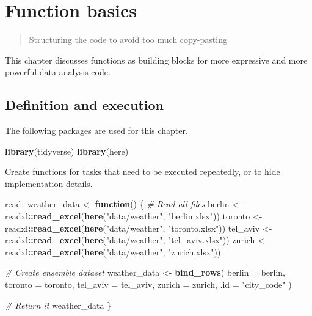 \documentclass[]{book}
\newenvironment{Shaded}{\begin{snugshade}}{\end{snugshade}}
\newcommand{\CommentTok}[1]{\textcolor[rgb]{0.56,0.35,0.01}{\textit{#1}}}
\newcommand{\ControlFlowTok}[1]{\textcolor[rgb]{0.13,0.29,0.53}{\textbf{#1}}}
\newcommand{\DataTypeTok}[1]{\textcolor[rgb]{0.13,0.29,0.53}{#1}}
\newcommand{\KeywordTok}[1]{\textcolor[rgb]{0.13,0.29,0.53}{\textbf{#1}}}
\newcommand{\NormalTok}[1]{#1}
\newcommand{\OperatorTok}[1]{\textcolor[rgb]{0.81,0.36,0.00}{\textbf{#1}}}
\newcommand{\StringTok}[1]{\textcolor[rgb]{0.31,0.60,0.02}{#1}}
\begin{document}
\hypertarget{function-basics}{%
\chapter{Function basics}\label{function-basics}}

\begin{quote}
Structuring the code to avoid too much copy-pasting
\end{quote}

This chapter discusses functions as building blocks for more expressive and more powerful data analysis code.

\hypertarget{definition-and-execution}{%
\section{Definition and execution}\label{definition-and-execution}}

The following packages are used for this chapter.

\begin{Shaded}
\begin{Highlighting}[]
\KeywordTok{library}\NormalTok{(tidyverse)}
\KeywordTok{library}\NormalTok{(here)}
\end{Highlighting}
\end{Shaded}

Create functions for tasks that need to be executed repeatedly, or to hide implementation details.

\begin{Shaded}
\begin{Highlighting}[]
\NormalTok{read_weather_data <-}\StringTok{ }\ControlFlowTok{function}\NormalTok{() \{}
  \CommentTok{# Read all files}
\NormalTok{  berlin <-}\StringTok{ }\NormalTok{readxl}\OperatorTok{::}\KeywordTok{read_excel}\NormalTok{(}\KeywordTok{here}\NormalTok{(}\StringTok{"data/weather"}\NormalTok{, }\StringTok{"berlin.xlsx"}\NormalTok{))}
\NormalTok{  toronto <-}\StringTok{ }\NormalTok{readxl}\OperatorTok{::}\KeywordTok{read_excel}\NormalTok{(}\KeywordTok{here}\NormalTok{(}\StringTok{"data/weather"}\NormalTok{, }\StringTok{"toronto.xlsx"}\NormalTok{))}
\NormalTok{  tel_aviv <-}\StringTok{ }\NormalTok{readxl}\OperatorTok{::}\KeywordTok{read_excel}\NormalTok{(}\KeywordTok{here}\NormalTok{(}\StringTok{"data/weather"}\NormalTok{, }\StringTok{"tel_aviv.xlsx"}\NormalTok{))}
\NormalTok{  zurich <-}\StringTok{ }\NormalTok{readxl}\OperatorTok{::}\KeywordTok{read_excel}\NormalTok{(}\KeywordTok{here}\NormalTok{(}\StringTok{"data/weather"}\NormalTok{, }\StringTok{"zurich.xlsx"}\NormalTok{))}

  \CommentTok{# Create ensemble dataset}
\NormalTok{  weather_data <-}\StringTok{ }\KeywordTok{bind_rows}\NormalTok{(}
    \DataTypeTok{berlin =}\NormalTok{ berlin,}
    \DataTypeTok{toronto =}\NormalTok{ toronto,}
    \DataTypeTok{tel_aviv =}\NormalTok{ tel_aviv,}
    \DataTypeTok{zurich =}\NormalTok{ zurich,}
    \DataTypeTok{.id =} \StringTok{"city_code"}
\NormalTok{  )}

  \CommentTok{# Return it}
\NormalTok{  weather_data}
\NormalTok{\}}
\end{Highlighting}
\end{Shaded}
\end{document}
